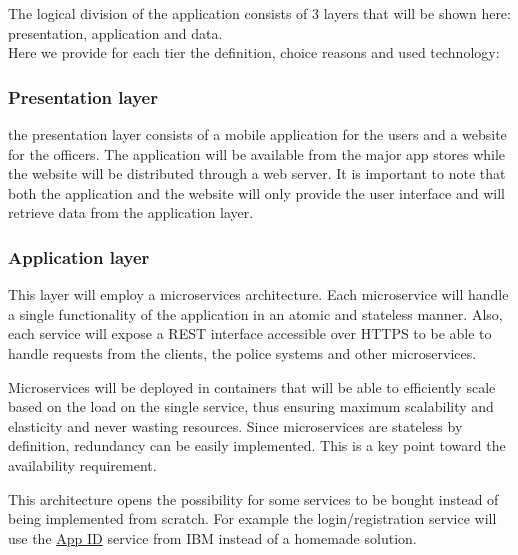 The logical division of the application consists of 3 layers that will be shown here: presentation, application and data.
\\Here we provide for each tier the definition, choice reasons and used technology:
\subsubsection{Presentation layer}\label{presentationlayer}
the presentation layer consists of a mobile application for the users and a website for the officers.
The application will be available from the major app stores while the website will be distributed through a web server.
It is important to note that both the application and the website will only provide the user interface and will retrieve data from the application layer.

\subsubsection{Application layer}\label{applicationlayer}
This layer will employ a microservices architecture.
Each microservice will handle a single functionality of the application in an atomic and stateless manner.
Also, each service will expose a REST interface accessible over HTTPS to be able to handle requests from the clients, the police systems and other microservices.

Microservices will be deployed in containers that will be able to efficiently scale based on the load on the single service, thus ensuring maximum scalability and elasticity and never wasting resources.
Since microservices are stateless by definition, redundancy can be easily implemented. This is a key point toward the availability requirement.

This architecture opens the possibility for some services to be bought instead of being implemented from scratch. For example the login/registration service will use the \hyperlink{appid}{App ID} service from IBM instead of a homemade solution.

